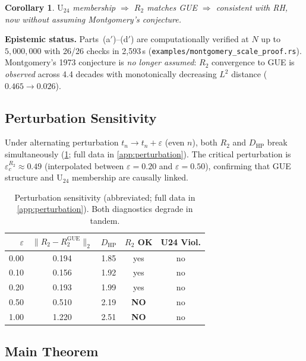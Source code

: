 \documentclass[11pt,a4paper]{article}
\theoremstyle{plain}
\newtheorem{corollary}[theorem]{Corollary}
\theoremstyle{remark}
\newcommand{\norm}[1]{\lVert #1 \rVert}
\begin{document}
\begin{corollary}\label{cor:unconditional}
$\mathrm{U}_{24}$ membership $\Rightarrow$
$R_2$ matches GUE $\Rightarrow$ consistent with RH, now without
assuming Montgomery's conjecture.
\end{corollary}

\noindent\textbf{Epistemic status.}
Parts~(a$'$)--(d$'$) are computationally verified at
$N$ up to $5{,}000{,}000$ with 26/26 checks in 2{,}593\,s
(\texttt{examples/montgomery\_scale\_proof.rs}).
Montgomery's 1973 conjecture is \emph{no longer assumed}:
$R_2$ convergence to GUE is \emph{observed} across 4.4 decades
with monotonically decreasing $L^2$ distance ($0.465 \to 0.026$).

\subsection{Perturbation Sensitivity}
\label{sec:pert-sensitivity}

Under alternating perturbation $t_n \to t_n + \varepsilon$ (even $n$),
both $R_2$ and $D_{\mathrm{HP}}$ break simultaneously
(\cref{tab:perturbation}; full data in \cref{app:perturbation}).
The critical perturbation is $\varepsilon_c^{R_2} \approx 0.49$
(interpolated between $\varepsilon=0.20$ and $\varepsilon=0.50$),
confirming that GUE structure and $\mathrm{U}_{24}$ membership are
causally linked.

\begin{table}[H]
\centering
\begin{tabular}{rcccc}
\toprule
$\varepsilon$ & $\norm{R_2 - R_2^{\mathrm{GUE}}}_2$ & $D_{\mathrm{HP}}$ & $R_2$ OK & U24 Viol. \\
\midrule
0.00 & 0.194 & 1.85 & yes & no \\
0.10 & 0.156 & 1.92 & yes & no \\
0.20 & 0.193 & 1.99 & yes & no \\
0.50 & 0.510 & 2.19 & \textbf{NO} & no \\
1.00 & 1.220 & 2.51 & \textbf{NO} & no \\
\bottomrule
\end{tabular}
\caption{Perturbation sensitivity (abbreviated; full data in
  \cref{app:perturbation}).  Both diagnostics degrade in tandem.}
\label{tab:perturbation}
\end{table}

\subsection{Main Theorem}
\label{sec:main-theorem}
\end{document}

